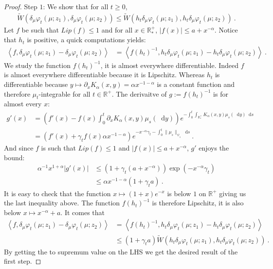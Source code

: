 \documentclass[11pt,a4paper]{article}
\newcommand{\RR}{\mathbb{R}}
\newcommand{\RRP}{\mathbb{R}^+_*}
\newcommand{\brac}[1]{\left\langle#1\right\rangle}
\newcommand{\dd}{\mathop{}\!\mathrm{d}}
\begin{document}
\begin{proof}
    Step $1$: We show that for all $t \geq 0$, 
    \begin{align*}
        \tilde{W}\left(\delta_\mu\varphi_t(\mu;z_1) ,\delta_\mu\varphi_t(\mu;z_2)\right) \leq \tilde{W}\left(h_t\delta_\mu\varphi_t(\mu;z_1) ,h_t \delta_\mu\varphi_t(\mu;z_2)\right)\ .
    \end{align*}
    Let $f$ be such that $Lip(f) \leq 1$ and for all $x \in \RRP$, $|f(x)| \leq a + x^{-\alpha}$. Notice that $h_t$ is positive, a quick computations yields:
    \begin{align*}
        \brac{f,\delta_\mu\varphi_t(\mu;z_1) - \delta_\mu\varphi_t(\mu;z_2)} &= \brac{f(h_t)^{-1},h_t\delta_\mu\varphi_t(\mu;z_1) - h_t\delta_\mu\varphi_t(\mu;z_2)}\ .
    \end{align*}
    We study the function $f (h_t)^{-1}$, it is almost everywhere differentiable. Indeed $f$ is almost everywhere differentiable because it is Lipschitz. Whereas $h_t$ is differentiable because $y \mapsto \partial_x K_\alpha(x,y) = \alpha x^{-1-\alpha}$ is a constant function and therefore $\mu_t$-integrable for all $t \in \RR^+$. The derivaitve of $g:=f (h_t)^{-1}$ is for almost every $x$:
    \begin{align*}
        g'(x) &= \left( f'(x) - f(x)\int_0^t\partial_x K_\alpha(x,y)\mu_s(\dd y) \right)e^{-\int_0^t \int_{\RRP}K_\alpha(x,y)\mu_s(\dd y) \dd s}\\
        &= \left( f'(x) + \gamma_t f(x)\alpha x^{-1-\alpha} \right)e^{-x^{-\alpha}\gamma_t - \int_0^t\|\mu_s\|_{\psi_1}\dd s}\ .
    \end{align*}
    And since $f$ is such that $Lip(f) \leq 1$ and $|f(x)| \leq a + x^{-\alpha} $, $g'$ enjoys the bound:
    \begin{align*}
        \alpha^{-1} x^{1+\alpha}\left|g'(x)\right| &\leq \left(1 + \gamma_t(a + x^{-\alpha}) \right)\exp\left(-x^{-\alpha}\gamma_t\right) \\
        &\leq \alpha x^{-1-\alpha} \left(1 + \gamma_t a \right)\ .
    \end{align*}
    It is easy to check that the function $x\mapsto (1 + x)e^{-x} $ is below $1$ on $\RR^+$ giving us the last inequality above.
    The function $f(h_t)^{-1}$ is therefore Lipschitz, it is also below $x\mapsto x^{-\alpha} + a$. It comes that 
    \begin{align*}
        \brac{f,\delta_\mu\varphi_t(\mu;z_1) - \delta_\mu\varphi_t(\mu;z_2)} &= \brac{f(h_t)^{-1},h_t\delta_\mu\varphi_t(\mu;z_1) - h_t\delta_\mu\varphi_t(\mu;z_2)} \\
        &\leq  \left(1 + \gamma_t a \right)\tilde{W}\left(h_t\delta_\mu\varphi_t(\mu;z_1) ,h_t \delta_\mu\varphi_t(\mu;z_2)\right)\ .
    \end{align*}
    By getting the to supremum value on the LHS we get the desired result of the first step.


\end{proof}
\end{document}
